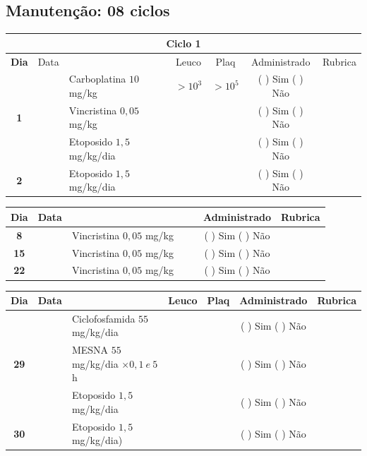 \documentclass[11pt,a4paper,oldfontcommands]{memoir}
\begin{document}
\subsection{Manutenção: 08 ciclos}
\begin{center}
\begin{longtable}{p{1cm}c|p{5cm}|p{1.5cm}p{1.5cm}|c|c}
	\hline
	\multicolumn{7}{c}{Ciclo 1} \\
	\hline
	\multicolumn{1}{c|}{\multirow{1}{*}{\textbf{Dia}}}&{Data}&{}&\multicolumn{1}{c|}{Leuco}&\multicolumn{1}{c|}{Plaq}&{Administrado}&{Rubrica} \\
    \hline
    \multicolumn{1}{c|}{\multirow{3}{*}{\textbf{1}}}&\multirow{2}{*}{}&{Carboplatina \(10\) mg/kg}&\multicolumn{1}{c|}{\(>10^3\)}&\multicolumn{1}{c|}{\(>10^5\)}&{(  ) Sim (  ) Não}&\\
    \cline{4-5}
    \multicolumn{1}{c|}{}&&{Vincristina \(0,05\) mg/kg}&\multicolumn{1}{c|}{}&&{(  ) Sim (  ) Não}&\\
    \cline{4-5}
    \multicolumn{1}{c|}{}&\multirow{1}{*}{}&{Etoposido \(1,5\) mg/kg/dia}&{}&&{(  ) Sim (  ) Não}&\\
    \cline{1-3}\cline{6-6}
    \multicolumn{1}{c|}{\textbf{2}}&\multirow{1}{*}{}&{Etoposido \(1,5\) mg/kg/dia}&{}&&{(  ) Sim (  ) Não}&\\
    \hline
\end{longtable}
\begin{longtable}{p{1cm}c|p{4cm}|p{2cm}p{2cm}|c|c}
	\hline
	\multicolumn{1}{c|}{\multirow{1}{*}{\textbf{Dia}}}&{Data}&{}&{}&&{Administrado}&{Rubrica} \\
    \hline
    \multicolumn{1}{c|}{\textbf{8}}&&{Vincristina \(0,05\) mg/kg}&\multicolumn{1}{c}{}&&{(  ) Sim (  ) Não}&\\
    \hline
    \multicolumn{1}{c|}{\textbf{15}}&&{Vincristina \(0,05\) mg/kg}&\multicolumn{1}{c}{}&&{(  ) Sim (  ) Não}&\\
    \hline
    \multicolumn{1}{c|}{\textbf{22}}&&{Vincristina \(0,05\) mg/kg}&\multicolumn{1}{c}{}&&{(  ) Sim (  ) Não}&\\
    \hline
\end{longtable}

\begin{longtable}{p{1cm}c|p{5cm}|p{1.5cm}p{1.5cm}|c|c}
	\hline
	\multicolumn{1}{c|}{\multirow{1}{*}{\textbf{Dia}}}&{Data}&{}&\multicolumn{1}{c|}{Leuco}&\multicolumn{1}{c|}{Plaq}&{Administrado}&{Rubrica} \\
    \hline
    \multicolumn{1}{c|}{\multirow{3}{*}{\textbf{29}}}&&{Ciclofosfamida \(55\) mg/kg/dia}&\multicolumn{1}{c|}{}&&{(  ) Sim (  ) Não}&\\
    \cline{4-5}
    \multicolumn{1}{c|}{}&&{MESNA \(55\) mg/kg/dia \(\times 0,1 \:e\: 5\)h}&&&{(  ) Sim (  ) Não}&\\
    \multicolumn{1}{c|}{}&&{Etoposido \(1,5\) mg/kg/dia}&&&{(  ) Sim (  ) Não}&\\
    \hline
    \multicolumn{1}{c|}{\multirow{1}{*}{\textbf{30}}}&&{Etoposido \(1,5\) mg/kg/dia)}&{}&&{(  ) Sim (  ) Não}&\\
    \hline
\end{longtable}
\end{center}
\end{document}

